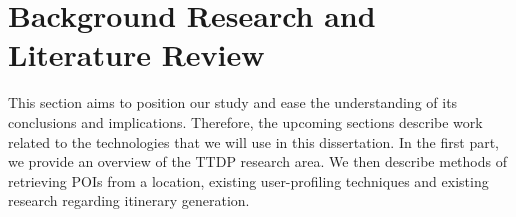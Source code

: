 
\section{Background Research and Literature Review}

This section aims to position our study and ease the understanding of its
conclusions and implications.  Therefore, the upcoming sections describe work
related to the technologies that we will use in this dissertation. In the first
part, we provide an overview of the TTDP research area. We then describe
methods of retrieving POIs from a location, existing user-profiling techniques
and existing research regarding itinerary generation.


